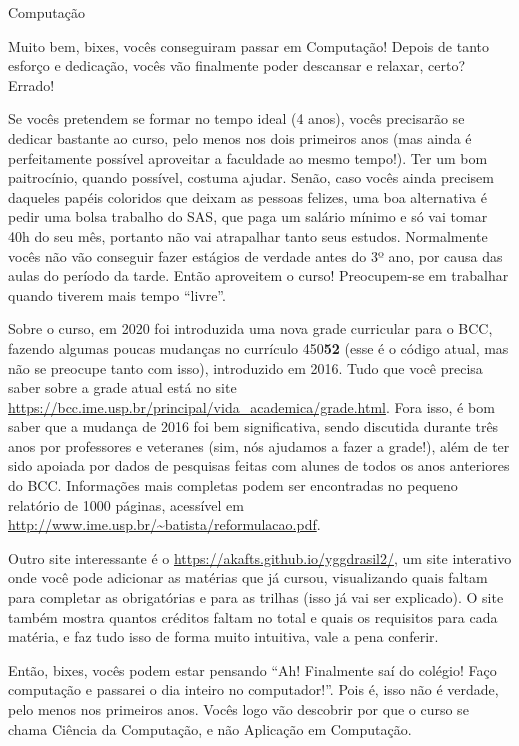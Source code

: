 \begin{subsecao}{Computação}

Muito bem, bixes, vocês conseguiram passar em Computação! Depois de tanto
esforço e dedicação, vocês vão finalmente poder descansar e relaxar, certo?
Errado!

Se vocês pretendem se formar no tempo ideal (4 anos), vocês precisarão se
dedicar bastante ao curso, pelo menos nos dois primeiros anos (mas ainda é
perfeitamente possível aproveitar a faculdade ao mesmo tempo!). Ter um bom
paitrocínio, quando possível, costuma ajudar. Senão, caso vocês ainda precisem
daqueles papéis coloridos que deixam as pessoas felizes, uma boa alternativa é
pedir uma bolsa trabalho do SAS, que paga um salário mínimo e só vai tomar
40h do seu mês, portanto não vai atrapalhar tanto seus estudos. Normalmente
vocês não vão conseguir fazer estágios de verdade antes do 3º ano, por causa
das aulas do período da tarde. Então aproveitem o curso! Preocupem-se em
trabalhar quando tiverem mais tempo ``livre''.

Sobre o curso, em 2020 foi introduzida uma nova grade curricular para o BCC,
fazendo algumas poucas mudanças no currículo 450\textbf{52} (esse é o código
atual, mas não se preocupe tanto com isso), introduzido em 2016. Tudo que você
precisa saber sobre a grade atual está no site
\url{https://bcc.ime.usp.br/principal/vida\_academica/grade.html}.
Fora isso, é bom saber que a mudança de 2016 foi bem significativa, sendo
discutida durante três anos por professores e veteranes (sim, nós ajudamos a
fazer a grade!), além de ter sido apoiada por dados de pesquisas feitas com
alunes de todos os anos anteriores do BCC. Informações mais completas podem
ser encontradas no pequeno relatório de 1000 páginas, acessível em
\url{http://www.ime.usp.br/~batista/reformulacao.pdf}.

Outro site interessante é o \url{https://akafts.github.io/yggdrasil2/}, um
site interativo onde você pode adicionar as matérias que já cursou,
visualizando quais faltam para completar as obrigatórias e para as trilhas
(isso já vai ser explicado). O site também mostra quantos créditos faltam no
total e quais os requisitos para cada matéria, e faz tudo isso de forma muito
intuitiva, vale a pena conferir.

Então, bixes, vocês podem estar pensando ``Ah! Finalmente saí do colégio! Faço
computação e passarei o dia inteiro no computador!''. Pois é, isso não é
verdade, pelo menos nos primeiros anos. Vocês logo vão descobrir por que o
curso se chama Ciência da Computação, e não Aplicação em Computação.


\end{subsecao}
